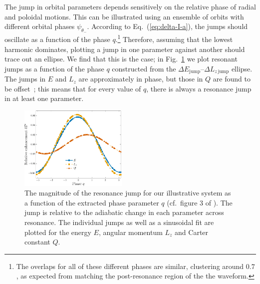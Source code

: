\documentclass[aps,prd,amsfonts,amssymb,amsmath,nofootinbib,showpacs,superscriptaddress,twocolumn,floatfix]{revtex4-1}
\newcommand{\eqnref}[1]{Eq.~(\ref{eq:#1})}
\newcommand{\figref}[1]{Fig.~\ref{fig:#1}}
\newcommand{\sub}[1]{\ensuremath{_\mathrm{#1}}}
\begin{document}
The jump in orbital parameters depends sensitively on the relative phase of radial and poloidal motions. This can be illustrated using an ensemble of orbits with different orbital phases $\psi_{\theta_-}$. According to \eqnref{delta-I-a}, the jumps should oscillate as a function of the phase $q$.\footnote{The overlaps for all of these different phases are similar, clustering around $0.7$, as expected from matching the post-resonance region of the the waveform.} Therefore, assuming that the lowest harmonic dominates, plotting a jump in one parameter against another should trace out an ellipse. We find that this is the case; in \figref{resjump-vs-q} we plot resonant jumps as a function of the phase $q$ constructed from the $\Delta E\sub{jump}$--$\Delta L_{z\,\mathrm{jump}}$ ellipse. The jumps in $E$ and $L_z$ are approximately in phase, but those in $Q$ are found to be offset~\cite{Flanagan2012a}; this means that for every value of $q$, there is always a resonance jump in at least one parameter.

\begin{figure}
\centering
\includegraphics[width=0.46\textwidth]{Fig_q_jump}
\caption{\label{fig:resjump-vs-q}The magnitude of the resonance jump for our illustrative system as a function of the extracted phase parameter $q$ (cf.\ figure 3 of \cite{Flanagan2012a}). The jump is relative to the adiabatic change in each parameter across resonance. The individual jumps as well as a sinusoidal fit are plotted for the energy $E$, angular momentum $L_z$ and Carter constant $Q$.}
\end{figure}

\end{document}
